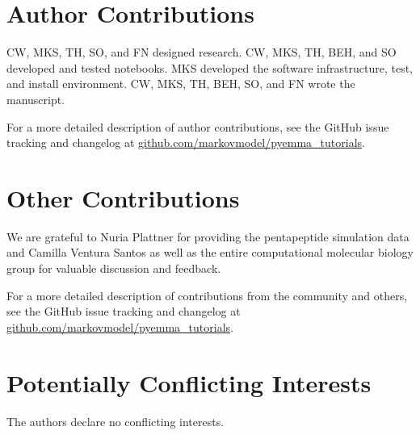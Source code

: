 \documentclass[9pt,tutorial]{livecoms}
\newcommand{\githubrepository}{\url{github.com/markovmodel/pyemma_tutorials}}
\begin{document}
\section{Author Contributions}
%
CW, MKS, TH, SO, and FN designed research.
CW, MKS, TH, BEH, and SO developed and tested notebooks.
MKS developed the software infrastructure, test, and install environment.
CW, MKS, TH, BEH, SO, and FN wrote the manuscript.

For a more detailed description of author contributions, see the GitHub issue tracking and changelog at \githubrepository{}.

\section{Other Contributions}
%
We are grateful to Nuria Plattner for providing the pentapeptide simulation data and Camilla Ventura Santos as well as the entire computational molecular biology group for valuable discussion and feedback.

For a more detailed description of contributions from the community and others, see the GitHub issue tracking and changelog at \githubrepository{}.

\section{Potentially Conflicting Interests}
The authors declare no conflicting interests.
\end{document}
